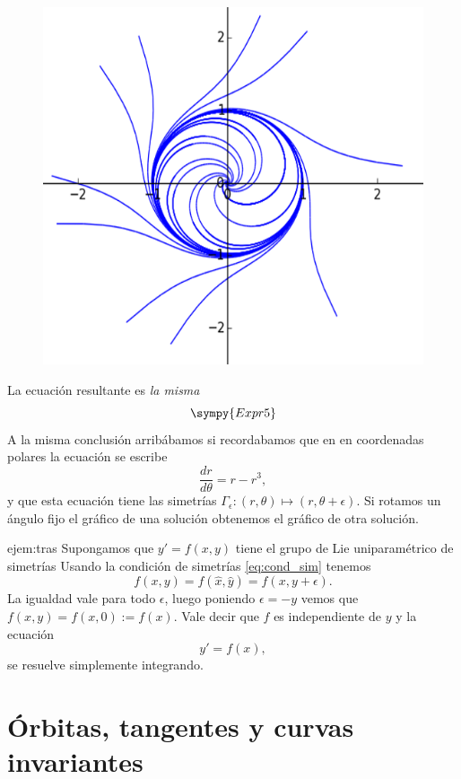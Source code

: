 \begin{figure}
 \includegraphics[scale=.4]{imagenes/sol_rotadas.png}
\end{figure}
La ecuación resultante es \emph{la misma}
\[\sympy{Expr5}\]
A la misma conclusión arribábamos si recordabamos que en en coordenadas polares la ecuación se escribe
\[\frac{dr}{d\theta}=r-r^3,\]
y que esta ecuación tiene las simetrías $\Gamma_{\epsilon}:(r,\theta)\mapsto (r,\theta+\epsilon)$. Si rotamos un ángulo fijo el gráfico de una solución obtenemos el gráfico de otra solución.








\begin{ejemplo}{ejem:tras} Supongamos que $y'=f(x,y)$ tiene  el grupo de Lie uniparamétrico de simetrías
Usando la condición de simetrías \eqref{eq:cond_sim} tenemos
\[f(x,y)=f(\hat{x},\hat{y})=f(x,y+\epsilon).\]
La igualdad vale para todo $\epsilon$, luego poniendo $\epsilon=-y$ vemos que $f(x,y)=f(x,0):=f(x)$. Vale decir que $f$ es independiente de $y$ y la ecuación
\[y'=f(x),\]
se resuelve simplemente integrando.
\end{ejemplo}



\section{Órbitas, tangentes y curvas invariantes}



